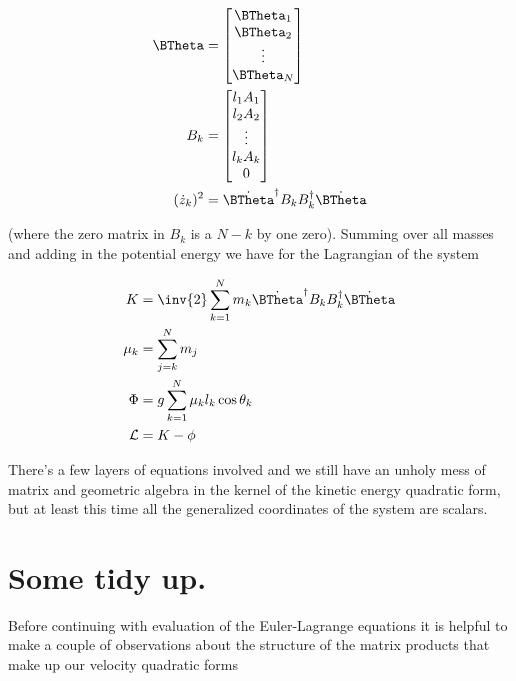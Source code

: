 \begin{align}\label{eqn:multiPendulumSpherical2:boo4}
\BTheta &=
\begin{bmatrix}
\BTheta_1 \\
\BTheta_2 \\
\vdots \\
\BTheta_N \\
\end{bmatrix} \\
B_k &=
\begin{bmatrix}
l_1 A_1 \\
l_2 A_2 \\
\vdots \\
l_k A_k \\
0 \\
\end{bmatrix} \\
(\dot{z}_k)^2 &=
\dot{\BTheta}^\dagger B_k B_k^\dagger \dot{\BTheta}
\end{align}

(where the zero matrix in $B_k$ is a $N-k$ by one zero).  Summing over all masses and adding in the potential energy we have for the Lagrangian of the system


\begin{align}\label{eqn:multiPendulumSpherical2:boo5}
K &=
\inv{2} \sum_{k=1}^N m_k
\dot{\BTheta}^\dagger
B_k B_k^\dagger
\dot{\BTheta} \\
\mu_k &= \sum_{j=k}^N m_j \\
\Phi &=
g \sum_{k=1}^N \mu_k l_k \cos\theta_k \\
\LL &= K - \phi
\end{align}

There's a few layers of equations involved and we still have an unholy mess of matrix and geometric algebra in the kernel of the kinetic energy quadratic form, but at least this time all the generalized coordinates of the system are scalars.

\section{Some tidy up.}

Before continuing with evaluation of the Euler-Lagrange equations it is helpful to make a couple of observations about the structure of the matrix products that make up our velocity quadratic forms

